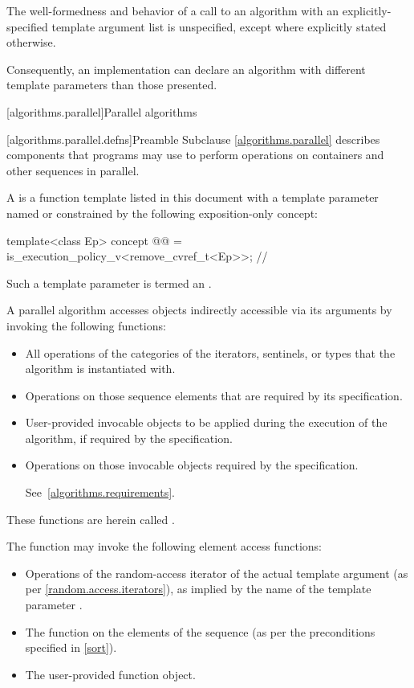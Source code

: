 \pnum
The well-formedness and behavior of a call to an algorithm with
an explicitly-specified template argument list
is unspecified, except where explicitly stated otherwise.
\begin{note}
Consequently, an implementation can declare an algorithm with
different template parameters than those presented.
\end{note}

[algorithms.parallel]{Parallel algorithms}

[algorithms.parallel.defns]{Preamble}
\pnum
Subclause \ref{algorithms.parallel} describes components that \Cpp{} programs may use
to perform operations on containers and other sequences in parallel.

\pnum
A  is a function template listed in this document
with a template parameter named 
or constrained by the following exposition-only concept:
\begin{codeblock}
template<class Ep>
  concept @@ = is_execution_policy_v<remove_cvref_t<Ep>>;     // \expos
\end{codeblock}
Such a template parameter is termed an .

\pnum
A parallel algorithm accesses objects indirectly accessible via its arguments
by invoking the following functions:
\begin{itemize}
\item
  All operations of the categories of the iterators, sentinels, or  types
  that the algorithm is instantiated with.
\item
  Operations on those sequence elements that are required by its specification.
\item
  User-provided invocable objects
  to be applied during the execution of the algorithm,
  if required by the specification.
\item
  Operations on those invocable objects required by the specification.
\begin{note}
See~\ref{algorithms.requirements}.
\end{note}
\end{itemize}
These functions are herein called .

\pnum
\begin{example}
The  function may invoke the following element access functions:
\begin{itemize}
\item
  Operations of the random-access iterator of the actual template argument
  (as per \ref{random.access.iterators}),
  as implied by the name of the template parameter .
\item
  The  function on the elements of the sequence
  (as per the preconditions specified in \ref{sort}).
\item
  The user-provided  function object.
\end{itemize}
\end{example}

